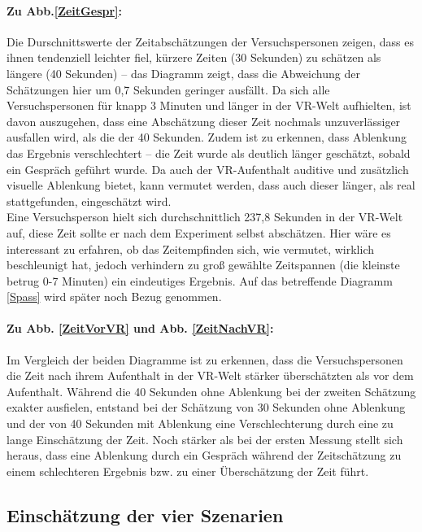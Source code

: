 \documentclass{Paper}
\begin{document}
\paragraph{Zu Abb.\ref{ZeitGespr}:} Die Durschnittswerte der Zeitabschätzungen der Versuchspersonen zeigen, dass es ihnen tendenziell leichter fiel, kürzere Zeiten (30 Sekunden) zu schätzen als längere (40 Sekunden) -- das Diagramm zeigt, dass die Abweichung der Schätzungen hier um 0,7 Sekunden geringer ausfällt. Da sich alle Versuchspersonen für knapp 3 Minuten und länger in der VR-Welt aufhielten, ist davon auszugehen, dass eine Abschätzung dieser Zeit nochmals unzuverlässiger ausfallen wird, als die der 40 Sekunden. Zudem ist zu erkennen, dass Ablenkung das Ergebnis verschlechtert -- die Zeit wurde als deutlich länger geschätzt, sobald ein Gespräch geführt wurde. Da auch der VR-Aufenthalt auditive und zusätzlich visuelle Ablenkung bietet, kann vermutet werden, dass auch dieser länger, als real stattgefunden, eingeschätzt wird.\\
Eine Versuchsperson hielt sich durchschnittlich 237,8 Sekunden in der VR-Welt auf, diese Zeit sollte er nach dem Experiment selbst abschätzen. Hier wäre es interessant zu erfahren, ob das Zeitempfinden sich, wie vermutet, wirklich beschleunigt hat, jedoch verhindern zu groß gewählte Zeitspannen (die kleinste betrug 0-7 Minuten) ein eindeutiges Ergebnis. Auf das betreffende Diagramm \ref{Spass} wird später noch Bezug genommen.

\paragraph{Zu Abb. \ref{ZeitVorVR} und Abb. \ref{ZeitNachVR}:} Im Vergleich der beiden Diagramme ist zu erkennen, dass die Versuchspersonen die Zeit nach ihrem Aufenthalt in der VR-Welt stärker überschätzten als vor dem Aufenthalt. Während die 40 Sekunden ohne Ablenkung bei der zweiten Schätzung exakter ausfielen, entstand bei der Schätzung von 30 Sekunden ohne Ablenkung und der von 40 Sekunden mit Ablenkung eine Verschlechterung durch eine zu lange Einschätzung der Zeit. Noch stärker als bei der ersten Messung stellt sich heraus, dass eine Ablenkung durch ein Gespräch während der Zeitschätzung zu einem schlechteren Ergebnis bzw. zu einer Überschätzung der Zeit führt.

\subsection{Einschätzung der vier Szenarien}
\end{document}
